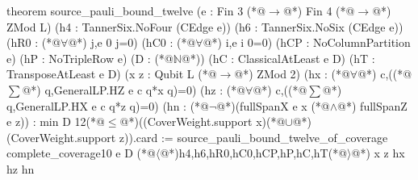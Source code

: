 theorem source_pauli_bound_twelve
    (e : Fin 3 (*@$\to$@*) Fin 4 (*@$\to$@*) ZMod L)
    (h4 : TannerSix.NoFour (CEdge e)) (h6 : TannerSix.NoSix (CEdge e))
    (hR0 : (*@$\forall$@*) j,e 0 j=0) (hC0 : (*@$\forall$@*) i,e i 0=0)
    (hCP : NoColumnPartition e) (hP : NoTripleRow e)
    (D : (*@$\mathbb N$@*)) (hC : ClassicalAtLeast e D) (hT : TransposeAtLeast e D)
    (x z : Qubit L (*@$\to$@*) ZMod 2)
    (hx : (*@$\forall$@*) c,((*@$\sum$@*) q,GeneralLP.HZ e c q*x q)=0)
    (hz : (*@$\forall$@*) c,((*@$\sum$@*) q,GeneralLP.HX e c q*z q)=0)
    (hn : (*@$\neg$@*)(fullSpanX e x (*@$\land$@*) fullSpanZ e z)) :
    min D 12(*@$\le$@*)((CoverWeight.support x)(*@$\cup$@*)(CoverWeight.support z)).card :=
  source_pauli_bound_twelve_of_coverage complete_coverage10 e D
    (*@$\langle$@*)h4,h6,hR0,hC0,hCP,hP,hC,hT(*@$\rangle$@*) x z hx hz hn
